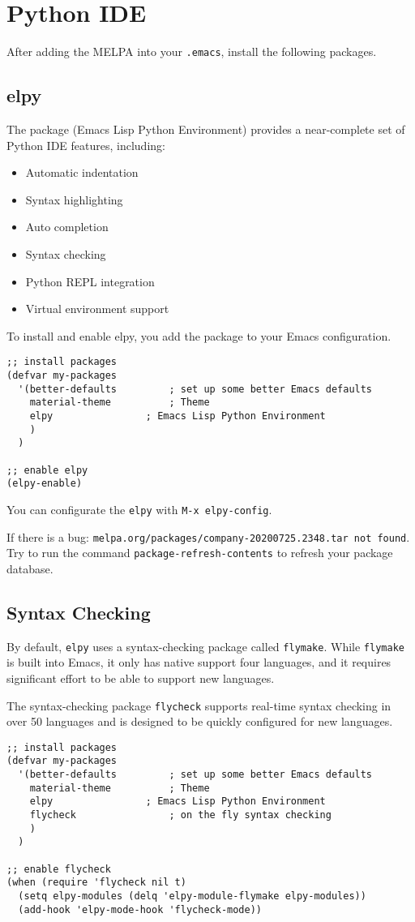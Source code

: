 \chapter{Python IDE}
After adding the MELPA into your \verb|.emacs|, install the following packages.

\section{elpy}
The  package (Emacs Lisp Python Environment) provides a near-complete set of Python IDE features, including:
\begin{itemize}
\item Automatic indentation
\item Syntax highlighting
\item Auto completion
\item Syntax checking
\item Python REPL integration
\item Virtual environment support
\end{itemize}

To install and enable elpy, you add the package to your Emacs configuration.
\lstset{language=Lisp}
\begin{lstlisting}
;; install packages
(defvar my-packages
  '(better-defaults			; set up some better Emacs defaults
    material-theme			; Theme
    elpy				; Emacs Lisp Python Environment
    )
  )

;; enable elpy
(elpy-enable)
\end{lstlisting}

You can configurate the \verb|elpy| with \verb|M-x elpy-config|.

\begin{tcolorbox}
  If there is a bug: \verb|melpa.org/packages/company-20200725.2348.tar not found|.
  Try to run the command \verb|package-refresh-contents| to refresh your package database.
\end{tcolorbox}

\section{Syntax Checking}
By default, \verb|elpy| uses a syntax-checking package called \verb|flymake|.
While \verb|flymake| is built into Emacs, it only has native support four languages, and it requires significant effort to be able to support new languages.

The syntax-checking package \verb|flycheck| supports real-time syntax checking in over 50 languages and is designed to be quickly configured for new languages.
\lstset{language=Lisp}
\begin{lstlisting}
;; install packages
(defvar my-packages
  '(better-defaults			; set up some better Emacs defaults
    material-theme			; Theme
    elpy				; Emacs Lisp Python Environment
    flycheck				; on the fly syntax checking
    )
  )

;; enable flycheck
(when (require 'flycheck nil t)
  (setq elpy-modules (delq 'elpy-module-flymake elpy-modules))
  (add-hook 'elpy-mode-hook 'flycheck-mode))
\end{lstlisting}


